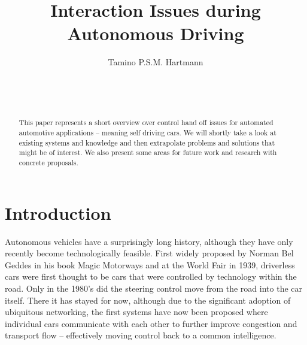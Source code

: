 \documentclass{acm_proc_article-sp}
\begin{document}

\title{Interaction Issues during Autonomous Driving}

\author{
\alignauthor
Tamino P.S.M. Hartmann\\
       \\
       \\
       \\
}


\maketitle
\begin{abstract}
This paper represents a short overview over control hand off issues for automated automotive applications – meaning self driving cars.
We will shortly take a look at existing systems and knowledge and then extrapolate problems and solutions that might be of interest.
We also present some areas for future work and research with concrete proposals.
\end{abstract}


\section{Introduction}

Autonomous vehicles have a surprisingly long history, although they have only recently become technologically feasible.
First widely proposed by Norman Bel Geddes in his book Magic Motorways \cite{geddes2009magic} and at the World Fair in 1939, driverless cars were first thought to be cars that were controlled by technology within the road.
Only in the 1980's did the steering control move from the road into the car itself.
There it has stayed for now, although due to the significant adoption of ubiquitous networking, the first systems have now been proposed where individual cars communicate with each other to further improve congestion and transport flow – effectively moving control back to a common intelligence.
\end{document}
